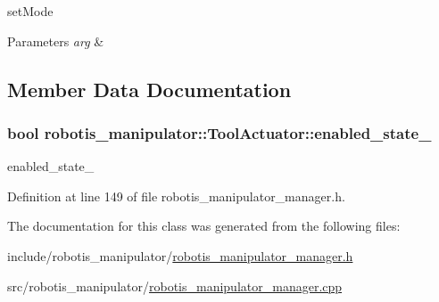 set\+Mode 


\begin{DoxyParams}{Parameters}
{\em arg} & \\
\hline
\end{DoxyParams}


\subsection{Member Data Documentation}
\subsubsection[{\texorpdfstring{enabled\+\_\+state\+\_\+}{enabled_state_}}]{\setlength{\rightskip}{0pt plus 5cm}bool robotis\+\_\+manipulator\+::\+Tool\+Actuator\+::enabled\+\_\+state\+\_\+}\hypertarget{classrobotis__manipulator_1_1_tool_actuator_ae9bdfbba232f772298d8c3342c125b4a}{}\label{classrobotis__manipulator_1_1_tool_actuator_ae9bdfbba232f772298d8c3342c125b4a}


enabled\+\_\+state\+\_\+ 



Definition at line 149 of file robotis\+\_\+manipulator\+\_\+manager.\+h.



The documentation for this class was generated from the following files\+:\begin{DoxyCompactItemize}
\item 
include/robotis\+\_\+manipulator/\hyperlink{robotis__manipulator__manager_8h}{robotis\+\_\+manipulator\+\_\+manager.\+h}\item 
src/robotis\+\_\+manipulator/\hyperlink{robotis__manipulator__manager_8cpp}{robotis\+\_\+manipulator\+\_\+manager.\+cpp}\end{DoxyCompactItemize}
